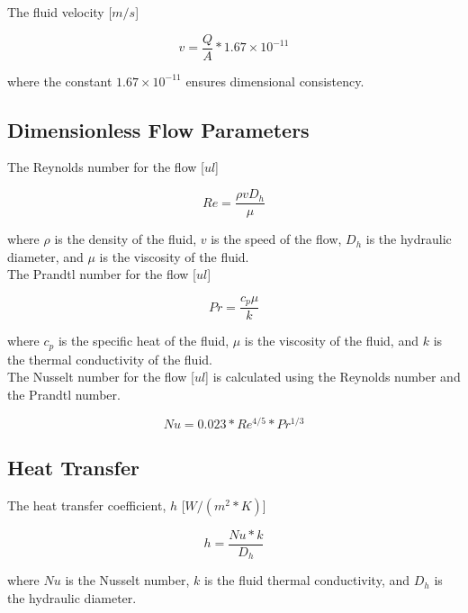 \documentclass{article}
\begin{document}
The fluid velocity [$m/s$]

\begin{equation}
	v = \frac{Q}{A} * 1.67 \times 10^{-11}
\end{equation}

where the constant $1.67 \times 10^{-11}$ ensures dimensional consistency.

\subsection{Dimensionless Flow Parameters}

The Reynolds number for the flow [$ul$]

\begin{equation}
	Re = \frac{ \rho v D_h }{ \mu }
\end{equation}

where $\rho$ is the density of the fluid, $v$ is the speed of the flow, $D_h$ is the hydraulic diameter, and $\mu$ is the viscosity of the fluid. \\

The Prandtl number for the flow [$ul$]

\begin{equation}
	Pr = \frac{c_p\mu}{k}
\end{equation}

where $c_p$ is the specific heat of the fluid, $\mu$ is the viscosity of the fluid, and $k$ is the thermal conductivity of the fluid. \\

The Nusselt number for the flow [$ul$] is calculated using the Reynolds number and the Prandtl number.

\begin{equation}
	Nu = 0.023 * Re^{4/5} * Pr^{1/3}
\end{equation}

\subsection{Heat Transfer}

The heat transfer coefficient, $h$ [$W/(m^2*K)$]

\begin{equation}
	h = \frac{Nu*k}{D_h}
\end{equation}

where $Nu$ is the Nusselt number, $k$ is the fluid thermal conductivity, and $D_h$ is the hydraulic diameter. \\
\end{document}
